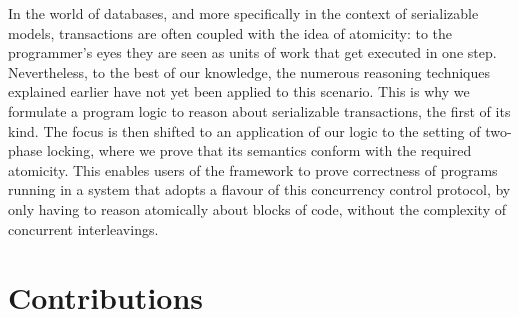In the world of databases, and more specifically in the context of serializable models, transactions are often coupled with the idea of atomicity: to the programmer's eyes they are seen as units of work that get executed in one step. Nevertheless, to the best of our knowledge, the numerous reasoning techniques explained earlier have not yet been applied to this scenario. This is why we formulate a program logic to reason about serializable transactions, the first of its kind. The focus is then shifted to an application of our logic to the setting of two-phase locking, where we prove that its semantics conform with the required atomicity. This enables users of the framework to prove correctness of  programs running in a system that adopts a flavour of this concurrency control protocol, by only having to reason atomically about blocks of code, without the complexity of concurrent interleavings. 

\section{Contributions}

